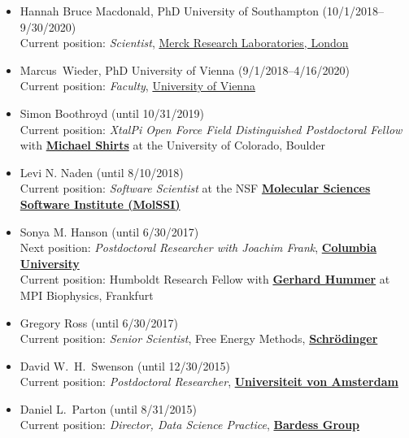 \documentclass[10pt]{article}
\begin{document}
\begin{itemize}
  \item Hannah Bruce Macdonald, PhD University of Southampton (10/1/2018--9/30/2020)\\
  Current position: \emph{Scientist}, \href{http://www.merck.com}{Merck Research Laboratories, London}
  
  \item Marcus~Wieder, PhD University of Vienna (9/1/2018--4/16/2020)\\
  Current position: \emph{Faculty}, \href{https://www.univie.ac.at/en/}{University of Vienna}

  \item Simon Boothroyd (until 10/31/2019)\\
  Current position: \emph{XtalPi Open Force Field Distinguished Postdoctoral Fellow} with \href{https://www.colorado.edu/lab/shirtsgroup/}{{\bf Michael Shirts}} at the University of Colorado, Boulder
  
  \item Levi N. Naden (until 8/10/2018)\\
  Current position: \emph{Software Scientist} at the NSF \href{http://molssi.org}{\bf Molecular Sciences Software Institute (MolSSI)}
  
  \item Sonya M. Hanson (until 6/30/2017)\\
  Next position: \emph{Postdoctoral Researcher with Joachim Frank}, \href{http://franklab.cpmc.columbia.edu/franklab/}{{\bf Columbia University}}\\
  Current position: Humboldt Research Fellow with \href{https://www.biophys.mpg.de/en/hummer.html}{{\bf Gerhard Hummer}} at MPI Biophysics, Frankfurt

  \item Gregory Ross (until 6/30/2017)\\
  Current position: \emph{Senior Scientist}, Free Energy Methods, \href{http://www.schrodinger.com}{{\bf Schr\"{o}dinger}}
  
  \item David W.~H.~Swenson (until 12/30/2015)\\
  Current position: \emph{Postdoctoral Researcher}, \href{http://www.acmm.nl/molsim/users/swenson/index.html}{{\bf Universiteit von Amsterdam}}
  
  \item Daniel L.~Parton (until 8/31/2015)\\
  Current position: \emph{Director, Data Science Practice}, \href{http://www.bardess.com/}{{\bf Bardess Group}}
  

\end{itemize}
\end{document}

